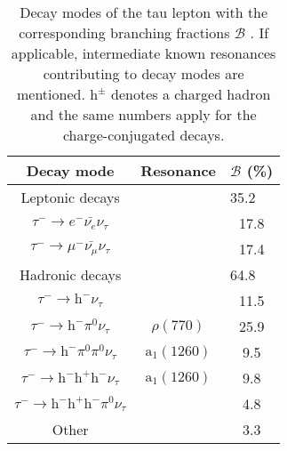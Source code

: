 \begin{table}[ht!]
	\caption{Decay modes of the tau lepton with the corresponding branching fractions $\mathcal{B}$ \cite{ParticleDataGroup:2020ssz}. If applicable, intermediate known resonances contributing to decay modes are mentioned. $\text{h}^\pm$ denotes a charged hadron and the same numbers apply for the charge-conjugated decays.}
    \centering
	\begin{tabular}{c|c|c}
		Decay mode & Resonance & $\mathcal{B}$ (\%)\\
		\hline
		Leptonic decays & & \multicolumn{1}{l}{35.2}\\
        $\tau^- \to e^- \bar{\nu_e} \nu_\tau$ &  & 17.8\\
        $\tau^- \to \mu^- \bar{\nu_\mu} \nu_\tau$ &  & 17.4 \\
        \hline
        Hadronic decays  & & \multicolumn{1}{l}{64.8} \\
        $\tau^- \to \text{h}^- \nu_\tau$ & & 11.5 \\
        $\tau^- \to \text{h}^- \pi^0 \nu_\tau$ & $\rho(770)$ & 25.9 \\ 
        $\tau^- \to \text{h}^- \pi^0 \pi^0 \nu_\tau$ & $\text{a}_1(1260)$ & 9.5 \\
        $\tau^- \to \text{h}^- \text{h}^+ \text{h}^- \nu_\tau$ & $\text{a}_1(1260)$ & 9.8 \\
        $\tau^- \to \text{h}^- \text{h}^+ \text{h}^- \pi^0 \nu_\tau$ & & 4.8 \\
        Other & & 3.3 \\
	\end{tabular} \label{tab:tau_decays}
\end{table}


